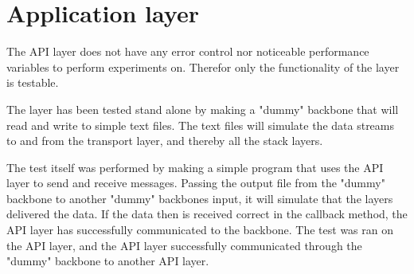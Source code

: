 \section{Application layer}

The API layer does not have any error control nor noticeable performance variables to perform experiments on. Therefor only the functionality of the layer is testable. 

The layer has been tested stand alone by making a "dummy" backbone that will read and write to simple text files. The text files will simulate the data streams to and from the transport layer, and thereby all the stack layers.


The test itself was performed by making a simple program that uses the API layer to send and receive messages. Passing the output file from the "dummy" backbone to another "dummy" backbones input, it will simulate that the layers delivered the data. If the data then is received correct in the callback method, the API layer has successfully communicated to the backbone. The test was ran on the API layer, and the API layer successfully communicated through the "dummy" backbone to another API layer.